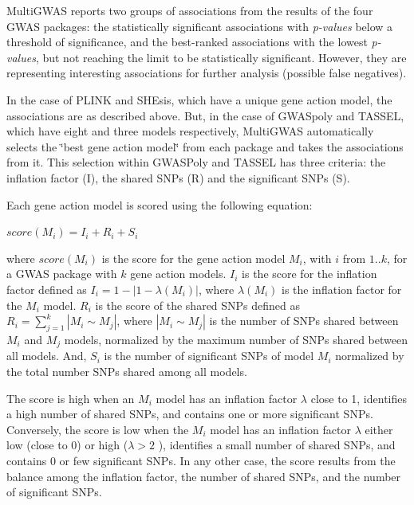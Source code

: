 \documentclass{article}
\begin{document}
MultiGWAS reports two groups of associations from the results of the four GWAS packages: the statistically significant associations with \emph{p-values} below a threshold of significance, and the best-ranked associations with the lowest \emph{p-values}, but not reaching the limit to be statistically significant. However, they are representing interesting associations for further analysis (possible false negatives).

In the case of PLINK and SHEsis, which have a unique gene action model, the associations are as described above. But, in the case of GWASpoly and TASSEL, which have eight and three models respectively, MultiGWAS automatically selects the \char`\"{}best gene action model\char`\"{} from each package and takes the associations from it. This selection within GWASPoly and TASSEL has three criteria: the inflation factor (I), the shared SNPs (R) and the significant SNPs (S).

Each gene action model is scored using the following equation: 
\begin{center}
$score(M_{i})=I{}_{i}+R_{i}+S{}_{i}$
\par\end{center}

where $score(M_{i})$ is the score for the gene action model $M_{i}$, with $i$ from $1..k$, for a GWAS package with $k$ gene action models. $I_{i}$ is the score for the inflation factor defined as $I_{i}=1-|1-\lambda(M_{i})|$, where $\lambda(M_{i})$ is the inflation factor for the $M_{i}$ model. $R_{i}$ is the score of the shared SNPs defined as $R_{i}=\sum\limits _{j=1}^{k}{\textstyle |M_{i}\sim M_{j}|}$, where ${\textstyle |M_{i}\sim M_{j}|}$ is the number of SNPs shared between $M_{i}$ and $M_{j}$ models, normalized by the maximum number of SNPs shared between all models. And, $S_{i}$ is the number of significant SNPs of model $M_{i}$ normalized by the total number SNPs shared among all models.

The score is high when an $M_{i}$ model has an inflation factor $\lambda$ close to 1, identifies a high number of shared SNPs, and contains one or more significant SNPs. Conversely, the score is low when the $M_{i}$ model has an inflation factor $\lambda$ either low (close to 0) or high ($\lambda>2$ ), identifies a small number of shared SNPs, and contains 0 or few significant SNPs. In any other case, the score results from the balance among the inflation factor, the number of shared SNPs, and the number of significant SNPs.
\end{document}
